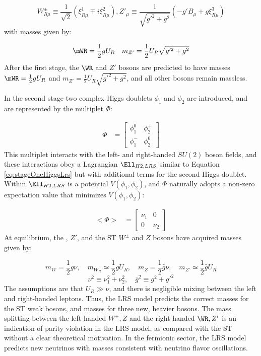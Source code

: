 \begin{equation}
	W^{\pm}_{R\mu} \equiv \frac{1}{\sqrt{2}}(\xi^{1}_{R\mu} \mp i\xi^{2}_{R\mu}), 
	Z'_{\mu} \equiv \frac{1}{\sqrt{g'^{2} + g^{2}}}(-g'B_{\mu} + g\xi^{3}_{R\mu})
\end{equation}
with masses given by:

\begin{equation}
	\mWR = \frac{1}{2}gU_{R}  \quad m_{Z'} = \frac{1}{2}U_{R}\sqrt{g'^{2} + g^{2}}
\end{equation}
After the first stage, the $\WR$ and $Z'$ bosons are predicted to have masses $\mWR = \frac{1}{2}gU_{R}$ and 
$m_{Z'} = \frac{1}{2}U_{R}\sqrt{g'^{2} + g^{2}}$, and all other bosons remain massless.

In the second stage \cite{lrsHiggsStageOne,lrsHiggsStageTwo} two complex Higgs doublets $\phi_{1}$ and $\phi_{2}$ 
are introduced, and are represented by the multiplet $\Phi$:

\begin{align}
	\Phi &= \begin{bmatrix}
	\phi^{0}_{1} & \phi^{+}_{2} \\
	\phi^{-}_{1} & \phi^{0}_{2}
	\end{bmatrix}
\end{align}
This multiplet interacts with the left- and right-handed $SU(2)$ boson fields, and these interactions obey a Lagrangian 
$\Ell_{H2,LRS}$ similar to Equation \ref{eq:stageOneHiggsLrs} but with additional terms for the second Higgs doublet.  
Within $\Ell_{H2,LRS}$ is a potential $V(\phi_{1},\phi_{2})$, and $\Phi$ naturally adopts a non-zero expectation 
value that minimizes $V(\phi_{1},\phi_{2})$:

\begin{align}
	<\Phi> &= \begin{bmatrix}
	\nu_{1} & 0 \\
	0 & \nu_{2}
	\end{bmatrix}
	\label{eq:stageTwoVEV}
\end{align}
At equilibrium, the \WR, $Z'$, and the ST $W^{\pm}$ and $Z$ bosons have acquired masses given by:

\begin{equation}
	m_{W} = \frac{1}{2}g\nu ,\quad m_{W_{R}} \simeq \frac{1}{2}gU_{R} ,\quad m_{Z} = \frac{1}{2}\bar{g}\nu ,\quad m_{Z'} \simeq \frac{1}{2}\bar{g}U_{R}
\end{equation}
\begin{equation}
	\nu^{2} \equiv \nu^{2}_{1} + \nu^{2}_{2} , \quad \bar{g}^{2} \equiv g^{2} + g'^{2}
\end{equation}
The assumptions are that $U_{R} \gg \nu$, and there is negligible mixing between the left and right-handed leptons.  
Thus, the LRS model predicts the correct masses for the ST weak bosons, and masses for three new, heavier bosons.  
The mass splitting between the left-handed $W^{\pm},Z$ and the right-handed $\WR,Z'$ is an indication of parity 
violation in the LRS model, as compared with the ST without a clear theoretical motivation.  In the fermionic sector, 
the LRS model predicts new neutrinos with masses consistent with neutrino flavor oscillations.


